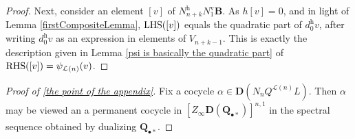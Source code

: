 \documentclass[11pt]{amsart} \renewcommand{\baselinestretch}{1.4}
\theoremstyle{plain}
\theoremstyle{definition}
\newcommand{\calL}{\mathcal{L}}
\newcommand{\EZ}[5]{[Z^{#1}_{#2}#3]^{#4}_{#5}}
\newcommand{\uver}{^\mathrm{v}}
\newcommand{\uhor}{^\mathrm{h}}
\newcommand{\dual}{\mathbf{D}}
\begin{document}
\begin{appendices}
\begin{proof}
Next, consider an element $[v]$ of $N\uhor_{n+k}N\uver_1\textbf{B}$. As $h[v]=0$, and in light of Lemma \ref{firstCompositeLemma}, $\textup{LHS}([v])$ equals the quadratic part of $d\uhor_0v$, after writing $d\uhor_0v$ as an expression in elements of $V_{n+k-1}$. This is exactly the description given in Lemma \ref{psi is basically the quadratic part} of $\textup{RHS}([v])=\psi_{\calL(n)}(v)$.
\end{proof}
\begin{proof}[Proof of \ref{the point of the appendix}]
Fix a cocycle $\alpha\in \dual(N_{n}Q^{\calL(n)} L)$. %
Then $\alpha$ may be viewed an a permanent cocycle in $\EZ{}{\infty}{\dual(\textbf{Q}_{\bullet*})}{n,1}{}$ in the spectral sequence obtained by dualizing $\textbf{Q}_{\bullet*}$. 


\end{proof}
\end{appendices}
\end{document}
